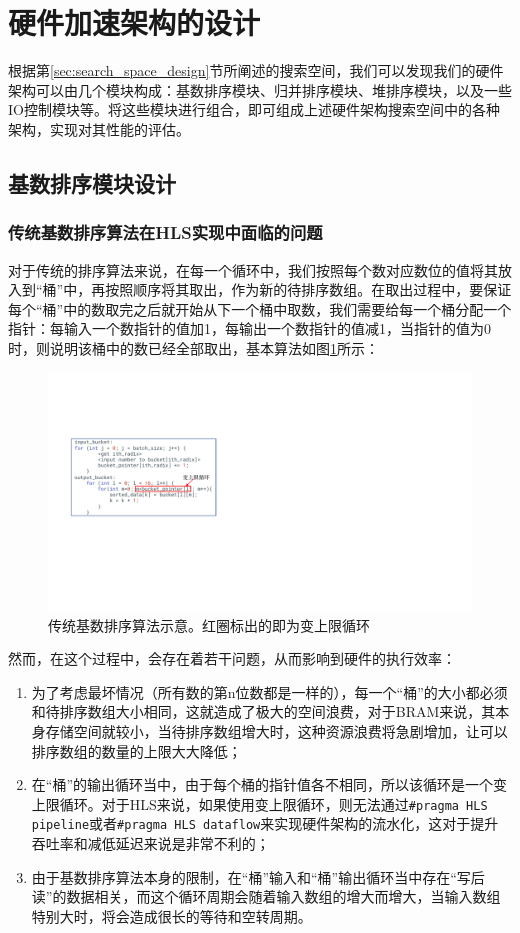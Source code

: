 \section{硬件加速架构的设计}

根据第\ref{sec:search_space_design}节所阐述的搜索空间，我们可以发现我们的硬件架构可以由几个模块构成：基数排序模块、归并排序模块、堆排序模块，以及一些IO控制模块等。将这些模块进行组合，即可组成上述硬件架构搜索空间中的各种架构，实现对其性能的评估。
\subsection{基数排序模块设计}
\subsubsection{传统基数排序算法在HLS实现中面临的问题}
对于传统的排序算法来说，在每一个循环中，我们按照每个数对应数位的值将其放入到“桶”中，再按照顺序将其取出，作为新的待排序数组。在取出过程中，要保证每个“桶”中的数取完之后就开始从下一个桶中取数，我们需要给每一个桶分配一个指针：每输入一个数指针的值加1，每输出一个数指针的值减1，当指针的值为0时，则说明该桶中的数已经全部取出，基本算法如图\ref{fig:traditional_radix_sort}所示：
\begin{figure}[htbp]
    \centering
    \includegraphics[width=12cm]{figures/traditional_radix_sort_algorithm.pdf}
    \caption{传统基数排序算法示意。红圈标出的即为变上限循环}
    \label{fig:traditional_radix_sort}
\end{figure}

然而，在这个过程中，会存在着若干问题，从而影响到硬件的执行效率：
\begin{enumerate}
    \item 为了考虑最坏情况（所有数的第n位数都是一样的），每一个“桶”的大小都必须和待排序数组大小相同，这就造成了极大的空间浪费，对于BRAM来说，其本身存储空间就较小，当待排序数组增大时，这种资源浪费将急剧增加，让可以排序数组的数量的上限大大降低；
    \item 在“桶”的输出循环当中，由于每个桶的指针值各不相同，所以该循环是一个变上限循环。对于HLS来说，如果使用变上限循环，则无法通过\verb|#pragma HLS pipeline|或者\verb|#pragma HLS dataflow|来实现硬件架构的流水化，这对于提升吞吐率和减低延迟来说是非常不利的；
    \item 由于基数排序算法本身的限制，在“桶”输入和“桶”输出循环当中存在“写后读”的数据相关，而这个循环周期会随着输入数组的增大而增大，当输入数组特别大时，将会造成很长的等待和空转周期。
\end{enumerate}

